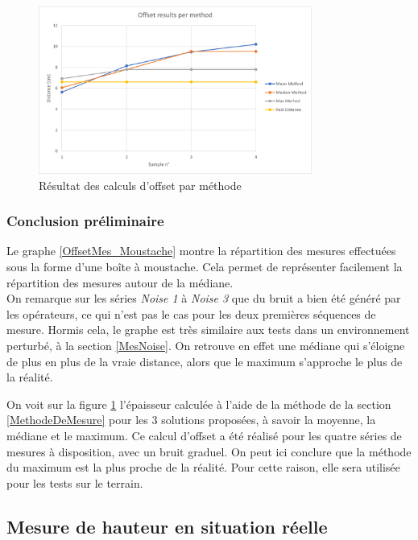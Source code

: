 \begin{figure}[H]
    \centering
    \includegraphics[width=0.8\textwidth]{Images/LiDAR/LiDAR_OffsetMes_PerMethods.png}
    \caption{Résultat des calculs d'offset par méthode}
    \label{OffsetMes_PerMethod}
\end{figure}

\subsubsection{Conclusion préliminaire} 

Le graphe \ref{OffsetMes_Moustache} montre la répartition des mesures effectuées sous la forme d'une
boîte à moustache. Cela permet de représenter facilement la répartition des mesures autour de la médiane.\\
On remarque sur les séries \emph{Noise 1} à \emph{Noise 3} que du bruit a bien été généré par les
opérateurs, ce qui n'est pas le cas pour les deux premières séquences de mesure. Hormis cela, le graphe
est très similaire aux tests dans un environnement perturbé, à la section \ref{MesNoise}. On retrouve
en effet une médiane qui s'éloigne de plus en plus de la vraie distance, alors que le maximum s'approche
le plus de la réalité.\par
On voit sur la figure \ref{OffsetMes_PerMethod} l'épaisseur calculée à l'aide de la méthode de la section
\ref{MethodeDeMesure} pour les 3 solutions proposées, à savoir la moyenne, la médiane et le maximum. Ce
calcul d'offset a été réalisé pour les quatre séries de mesures à disposition, avec un bruit graduel. On 
peut ici conclure que la méthode du maximum est la plus proche de la réalité. Pour cette raison, elle sera
utilisée pour les tests sur le terrain.

\subsection{Mesure de hauteur en situation réelle}

